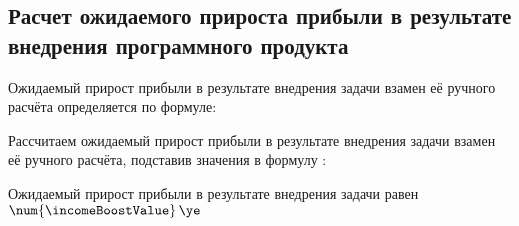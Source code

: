 \subsection{Расчет ожидаемого прироста прибыли в результате внедрения программного продукта}
\label{sec:economics:icomeBoost}

Ожидаемый прирост прибыли в результате внедрения задачи взамен её ручного расчёта определяется по формуле:
\incomeBoostEquation

Рассчитаем ожидаемый прирост прибыли в результате внедрения задачи взамен её ручного расчёта, подставив значения в формулу :
\incomeBoostFormulaApplied

Ожидаемый прирост прибыли в результате внедрения задачи равен \(\num{\incomeBoostValue} \, \ye\)